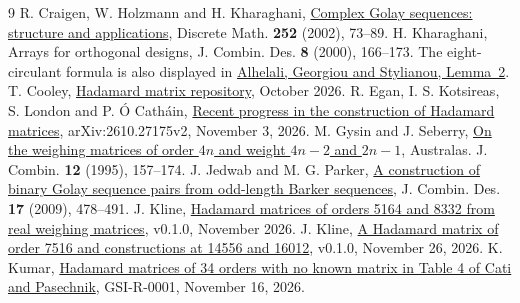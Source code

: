 \documentclass[10pt]{article}
\begin{document}
\begingroup\small
\begin{thebibliography}{9}\setlength{\itemsep}{0pt}
 R. Craigen, W. Holzmann and H. Kharaghani, \href{https://doi.org/10.1016/S0012-365X(01)00162-5}{Complex Golay sequences: structure and applications}, Discrete Math. \textbf{252} (2002), 73--89.
 H. Kharaghani, Arrays for orthogonal designs, J. Combin. Des. \textbf{8} (2000), 166--173. The eight-circulant formula is also displayed in \href{https://www3.stat.sinica.edu.tw/ss_newpaper/SS-2024-0379_na.pdf}{Alhelali, Georgiou and Stylianou, Lemma~2}.
 T. Cooley, \href{https://github.com/Middletownbooks/Hadamard}{Hadamard matrix repository}, October 2026.
 R. Egan, I. S. Kotsireas, S. London and P. \'O Cath\'ain, \href{https://arxiv.org/abs/2610.27175v2}{Recent progress in the construction of Hadamard matrices}, arXiv:2610.27175v2, November 3, 2026.
 M. Gysin and J. Seberry, \href{https://ajc.maths.uq.edu.au/pdf/12/ocr-ajc-v12-p157.pdf}{On the weighing matrices of order $4n$ and weight $4n-2$ and $2n-1$}, Australas. J. Combin. \textbf{12} (1995), 157--174.
 J. Jedwab and M. G. Parker, \href{https://doi.org/10.1002/jcd.20222}{A construction of binary Golay sequence pairs from odd-length Barker sequences}, J. Combin. Des. \textbf{17} (2009), 478--491.
 J. Kline, \href{https://doi.org/10.5281/zenodo.24519197}{Hadamard matrices of orders 5164 and 8332 from real weighing matrices}, v0.1.0, November 2026.
 J. Kline, \href{https://doi.org/10.5281/zenodo.24549453}{A Hadamard matrix of order 7516 and constructions at 14556 and 16012}, v0.1.0, November 26, 2026.
 K. Kumar, \href{https://generalised.si/research/hadamard-matrices}{Hadamard matrices of 34 orders with no known matrix in Table 4 of Cati and Pasechnik}, GSI-R-0001, November 16, 2026.
\end{thebibliography}
\endgroup
\end{document}
